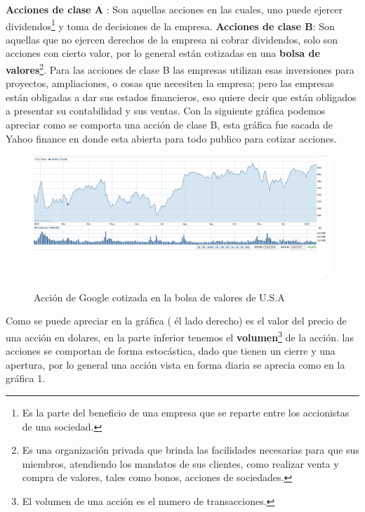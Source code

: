 		\textbf{ Acciones de clase A }: Son aquellas acciones en las cuales, uno puede ejercer dividendos\footnote{Es la parte del beneficio de una empresa que se reparte entre los accionistas de una sociedad.} y toma de decisiones de la empresa.
 		\newline
 		\textbf{ Acciones de clase B}: Son aquellas que no ejercen derechos de la empresa ni cobrar dividendos, solo son acciones con cierto valor, por lo general están cotizadas en una \textbf{bolsa de valores}\footnote{Es una organización privada que brinda las facilidades necesarias para que sus miembros, atendiendo los mandatos de sus clientes, como realizar venta y compra de valores, tales como bonos, acciones de sociedades.}.
 		\newline
 		Para las acciones de clase B las empresas utilizan esas inversiones para proyectos, ampliaciones, o cosas que necesiten la empresa; pero las empresas están obligadas a dar sus estados financieros, eso quiere decir que están obligados a presentar su contabilidad y sus ventas.  \newline
	Con la siguiente gráfica podemos apreciar como se comporta una acción de clase B, esta gráfica fue sacada de Yahoo finance en donde esta abierta para todo publico para cotizar acciones.
\begin{figure}[h]
	\centering
	\label{Accion de Google cotizadas en NASDAQ}
	\includegraphics[width=1.2\linewidth]{google}\\
	\caption[Titulo en el índice de figuras (opcional)]{Acción de Google  cotizada en la bolsa de valores de U.S.A}
\end{figure}
		\newpage
		Como se puede apreciar en la gráfica ( él lado derecho) es el valor del precio de una acción en dolares, en la parte inferior tenemos el \textbf{volumen}\footnote{El volumen de una acción es el numero de transacciones. } de la acción.
		 \newline
		 las acciones se comportan de forma estocástica, dado que tienen un cierre y una apertura, por lo general una acción vista en forma diaria se aprecia como en la gráfica 1.
